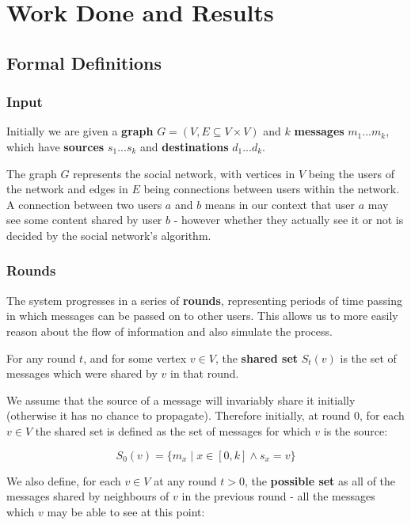 \documentclass[bsc,frontabs,twoside,singlespacing,parskip,deptreport]{infthesis}     %
\begin{document}
\chapter{Work Done and Results}
\section{Formal Definitions}

\subsection{Input}
Initially we are given a \textbf{graph} $G = (V, E \subseteq V \times V)$ and $k$ \textbf{messages} $ m_{1} ... m_{k}$, which have \textbf{sources} $s_{1} ... s_{k}$ and \textbf{destinations} $d_{1} ... d_{k}$. 

The graph $G$ represents the social network, with vertices in $V$ being the users of the network and edges in $E$ being connections between users within the network. A connection between two users $a$ and $b$ means in our context that user $a$ may see some content shared by user $b$ - however whether they actually see it or not is decided by the social network's algorithm.

\subsection{Rounds}
The system progresses in a series of \textbf{rounds}, representing periods of time passing in which messages can be passed on to other users. This allows us to more easily reason about the flow of information and also simulate the process.

For any round $t$, and for some vertex $v \in V$, the \textbf{shared set} $S_{t}(v)$ is the set of messages which were shared by $v$ in that round.

We assume that the source of a message will invariably share it initially (otherwise it has no chance to propagate). Therefore initially, at round 0, for each $v \in V$ the shared set is defined as the set of messages for which $v$ is the source:

\begin{equation}
S_{0}(v) = \{m_{x} \; | \; x \in [0, k] \wedge s_{x} = v\}
\end{equation}


We also define, for each $v \in V$ at any round $t > 0$, the \textbf{possible set} as all of the messages shared by neighbours of $v$ in the previous round - all the messages which $v$ may be able to see at this point:
\end{document}

